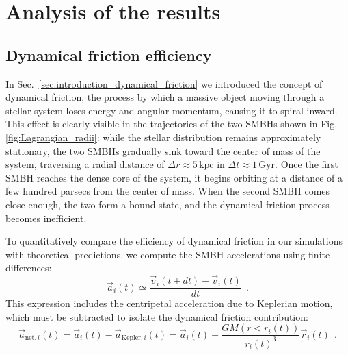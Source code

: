 \documentclass[fleqn,usenatbib]{mnras}
\begin{document}
\section{Analysis of the results}\label{sec:analysis}
\subsection{Dynamical friction efficiency}\label{sec:analysis_dynamical_friction}
In Sec.~\ref{sec:introduction_dynamical_friction} we introduced the concept of dynamical friction, the process by which a massive object moving through a stellar system loses energy and angular momentum, causing it to spiral inward.
This effect is clearly visible in the trajectories of the two SMBHs shown in Fig. \ref{fig:Lagrangian_radii}: while the stellar distribution remains approximately stationary, the two SMBHs gradually sink toward the center of mass of the system, traversing a radial distance of $\Delta r \approx 5 \,\text{kpc}$ in $\Delta t \approx 1 \,\text{Gyr}$.
Once the first SMBH reaches the dense core of the system, it begins orbiting at a distance of a few hundred parsecs from the center of mass.
When the second SMBH comes close enough, the two form a bound state, and the dynamical friction process becomes inefficient.
\vspace{0.5em}

To quantitatively compare the efficiency of dynamical friction in our simulations with theoretical predictions, we compute the SMBH accelerations using finite differences:
\begin{equation}
    \vec{a}_i(t) \simeq \dfrac{\vec{v}_i(t+dt) - \vec{v}_i(t)}{dt} \:\: .
    \label{eq:acceleration}
\end{equation}
This expression includes the centripetal acceleration due to Keplerian motion, which must be subtracted to isolate the dynamical friction contribution:
\begin{equation}
    \vec{a}_{\text{net},i}(t) = \vec{a}_i(t) - \vec{a}_{\text{Kepler},i}(t)
    = \vec{a}_i(t) + \dfrac{GM\left(r<r_i(t)\right)}{r_i(t)^3} \vec{r}_i(t) \:\: .
    \label{eq:acceleration_dynamical_friction}
\end{equation}
\vspace{0.5em}
\end{document}
